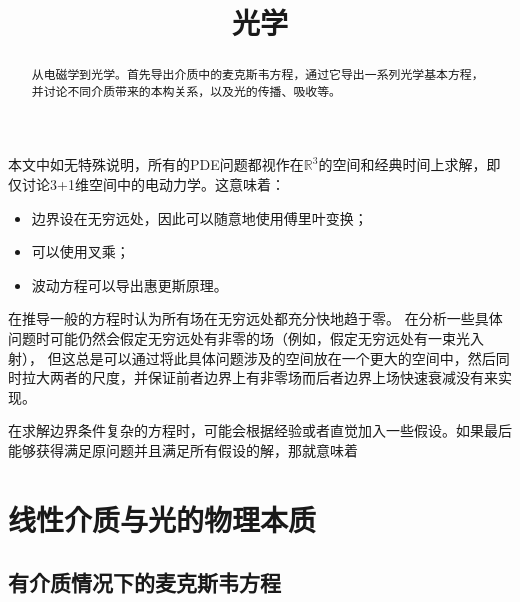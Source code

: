\documentclass[UTF8, a4paper]{ctexart}
\title{光学}
\author{}
\newcommand*{\reals}{\mathbb{R}}
\begin{document}
\maketitle

\begin{abstract}
    从电磁学到光学。首先导出介质中的麦克斯韦方程，通过它导出一系列光学基本方程，并讨论不同介质带来的本构关系，以及光的传播、吸收等。
\end{abstract}
\vspace{2em}

本文中如无特殊说明，所有的PDE问题都视作在$\reals^3$的空间和经典时间上求解，即仅讨论3+1维空间中的电动力学。这意味着：
\begin{itemize}
    \item 边界设在无穷远处，因此可以随意地使用傅里叶变换；
    \item 可以使用叉乘；
    \item 波动方程可以导出惠更斯原理。
\end{itemize}

在推导一般的方程时认为所有场在无穷远处都充分快地趋于零。
在分析一些具体问题时可能仍然会假定无穷远处有非零的场（例如，假定无穷远处有一束光入射），
但这总是可以通过将此具体问题涉及的空间放在一个更大的空间中，然后同时拉大两者的尺度，并保证前者边界上有非零场而后者边界上场快速衰减没有来实现。

在求解边界条件复杂的方程时，可能会根据经验或者直觉加入一些假设。如果最后能够获得满足原问题并且满足所有假设的解，那就意味着

\section{线性介质与光的物理本质}

\subsection{有介质情况下的麦克斯韦方程}
\end{document}
